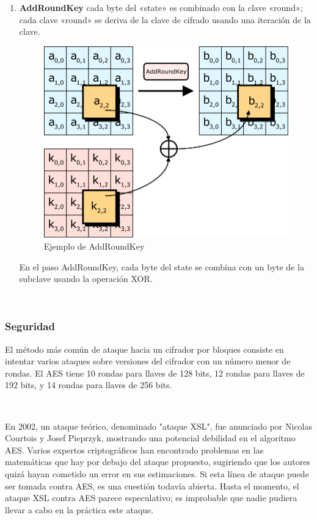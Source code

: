 \documentclass[11pt, conference]{IEEEtran}
\begin{document}
\begin{enumerate}
	\item \textbf{AddRoundKey} cada byte del «state» es combinado con la clave «round»; cada clave «round» se deriva de la clave de cifrado usando una iteración de la clave.
	
	\begin{figure}[h]
		\centering
		\includegraphics[scale=0.22]{AddRoundKey.png} 
		\caption{Ejemplo de AddRoundKey}
	\end{figure}
	
	En el paso AddRoundKey, cada byte del state se combina con un byte de la subclave usando la operación XOR.\cite{b}
\end{enumerate}

\
\pagebreak
\subsubsection{Seguridad}
El método más común de ataque hacia un cifrador por bloques consiste en intentar varios ataques sobre versiones del cifrador con un número menor de rondas. El AES tiene 10 rondas para llaves de 128 bits, 12 rondas para llaves de 192 bits, y 14 rondas para llaves de 256 bits. 

\

En 2002, un ataque teórico, denominado "ataque XSL", fue anunciado por Nicolas Courtois y Josef Pieprzyk, mostrando una potencial debilidad en el algoritmo AES. Varios expertos criptográficos han encontrado problemas en las matemáticas que hay por debajo del ataque propuesto, sugiriendo que los autores quizá hayan cometido un error en sus estimaciones. Si esta línea de ataque puede ser tomada contra AES, es una cuestión todavía abierta. Hasta el momento, el ataque XSL contra AES parece especulativo; es improbable que nadie pudiera llevar a cabo en la práctica este ataque.
\end{document}
